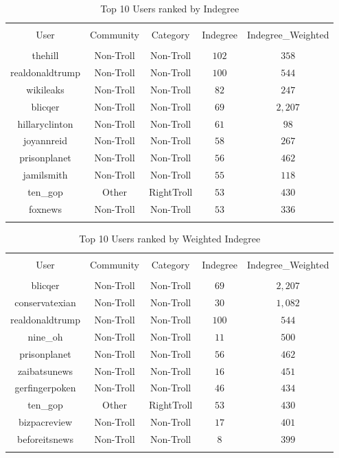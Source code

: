 \documentclass[12pt, titlepage=true, toc=bib]{scrartcl}
\begin{document}
\begin{table}[!htbp] \centering 
  \caption{Top 10 Users ranked by Indegree} 
  \label{tab:in} 
\begin{tabular}{@{\extracolsep{5pt}} ccccc} 
\\[-1.8ex]\hline 
\hline \\[-1.8ex] 
User & Community & Category & Indegree & Indegree\_Weighted \\ 
\hline \\[-1.8ex] 
thehill & Non-Troll & Non-Troll & $102$ & $358$ \\ 
realdonaldtrump & Non-Troll & Non-Troll & $100$ & $544$ \\ 
wikileaks & Non-Troll & Non-Troll & $82$ & $247$ \\ 
blicqer & Non-Troll & Non-Troll & $69$ & $2,207$ \\ 
hillaryclinton & Non-Troll & Non-Troll & $61$ & $98$ \\ 
joyannreid & Non-Troll & Non-Troll & $58$ & $267$ \\ 
prisonplanet & Non-Troll & Non-Troll & $56$ & $462$ \\ 
jamilsmith & Non-Troll & Non-Troll & $55$ & $118$ \\ 
ten\_gop & Other & RightTroll & $53$ & $430$ \\ 
foxnews & Non-Troll & Non-Troll & $53$ & $336$ \\ 
\hline \\[-1.8ex] 
\end{tabular} 
\end{table} 

\begin{table}[!htbp] \centering 
  \caption{Top 10 Users ranked by Weighted Indegree} 
  \label{tab:win} 
\begin{tabular}{@{\extracolsep{5pt}} ccccc} 
\\[-1.8ex]\hline 
\hline \\[-1.8ex] 
User & Community & Category & Indegree & Indegree\_Weighted \\ 
\hline \\[-1.8ex] 
blicqer & Non-Troll & Non-Troll & $69$ & $2,207$ \\ 
conservatexian & Non-Troll & Non-Troll & $30$ & $1,082$ \\ 
realdonaldtrump & Non-Troll & Non-Troll & $100$ & $544$ \\ 
nine\_oh & Non-Troll & Non-Troll & $11$ & $500$ \\ 
prisonplanet & Non-Troll & Non-Troll & $56$ & $462$ \\ 
zaibatsunews & Non-Troll & Non-Troll & $16$ & $451$ \\ 
gerfingerpoken & Non-Troll & Non-Troll & $46$ & $434$ \\ 
ten\_gop & Other & RightTroll & $53$ & $430$ \\ 
bizpacreview & Non-Troll & Non-Troll & $17$ & $401$ \\ 
beforeitsnews & Non-Troll & Non-Troll & $8$ & $399$ \\ 
\hline \\[-1.8ex] 
\end{tabular} 
\end{table}
\end{document}
